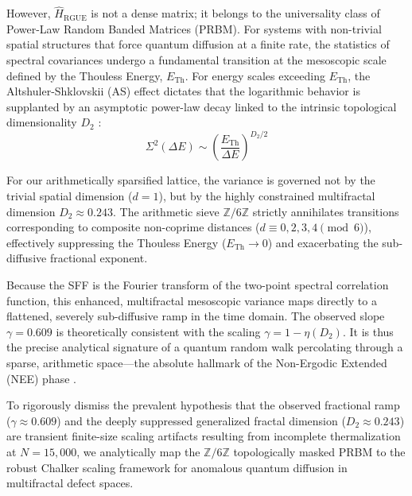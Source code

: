 \documentclass[aps,prl,preprint,superscriptaddress,floatfix]{revtex4-2}
\newcommand{\Zmod}{\mathbb{Z}/6\mathbb{Z}}
\begin{document}
However, $\hat{H}_{\text{RGUE}}$ is not a dense matrix; it belongs to the universality class of Power-Law Random Banded Matrices (PRBM). For systems with non-trivial spatial structures that force quantum diffusion at a finite rate, the statistics of spectral covariances undergo a fundamental transition at the mesoscopic scale defined by the Thouless Energy, $E_{\text{Th}}$. For energy scales exceeding $E_{\text{Th}}$, the Altshuler-Shklovskii (AS) effect dictates that the logarithmic behavior is supplanted by an asymptotic power-law decay linked to the intrinsic topological dimensionality $D_2$ \cite{Erdos2013, Erdos2015}:
\begin{equation}
\Sigma^2(\Delta E) \sim \left( \frac{E_{\text{Th}}}{\Delta E} \right)^{D_2/2}
\end{equation}

For our arithmetically sparsified lattice, the variance is governed not by the trivial spatial dimension ($d=1$), but by the highly constrained multifractal dimension $D_2 \approx 0.243$. The arithmetic sieve $\Zmod$ strictly annihilates transitions corresponding to composite non-coprime distances ($d \equiv 0,2,3,4 \pmod 6$), effectively suppressing the Thouless Energy ($E_{\text{Th}} \to 0$) and exacerbating the sub-diffusive fractional exponent.

Because the SFF is the Fourier transform of the two-point spectral correlation function, this enhanced, multifractal mesoscopic variance maps directly to a flattened, severely sub-diffusive ramp in the time domain. The observed slope $\gamma = 0.609$ is theoretically consistent with the scaling $\gamma = 1 - \eta(D_2)$. It is thus the precise analytical signature of a quantum random walk percolating through a sparse, arithmetic space—the absolute hallmark of the Non-Ergodic Extended (NEE) phase \cite{Kravtsov2015, Khaymovich2020, GarciaGarcia2024}.

To rigorously dismiss the prevalent hypothesis that the observed fractional ramp ($\gamma \approx 0.609$) and the deeply suppressed generalized fractal dimension ($D_2 \approx 0.243$) are transient finite-size scaling artifacts resulting from incomplete thermalization at $N=15,000$, we analytically map the $\Zmod$ topologically masked PRBM to the robust Chalker scaling framework for anomalous quantum diffusion in multifractal defect spaces.
\end{document}
